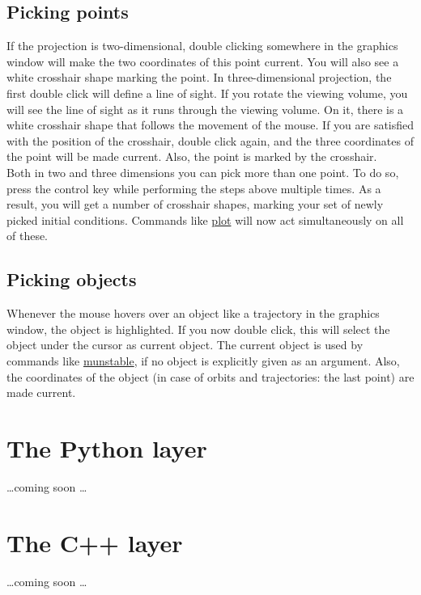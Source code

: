\documentclass[10pt,a4paper,titlepage]{article}
\newcommand{\HL}[1]{\hyperlink{#1}{#1}}
\begin{document}
\subsection{Picking points}
If the projection is two-dimensional, double clicking somewhere in the graphics window will make the two coordinates of this point current. You will also see a white crosshair shape marking the point. In three-dimensional projection, the first double click will define a line of sight. If you rotate the viewing volume, you will see the line of sight as it runs through the viewing volume. On it, there is a white crosshair shape that follows the movement of the mouse. If you are satisfied with the position of the crosshair, double click again, and the three coordinates of the point will be made current. Also, the point is marked by the crosshair.\\
Both in two and three dimensions you can pick more than one point. To do so, press the control key while performing the steps above multiple times. As a result, you will get a number of crosshair shapes, marking your set of newly picked initial conditions. Commands like \HL{plot} will now act simultaneously on all of these.
\subsection{Picking objects}
Whenever the mouse hovers over an object like a trajectory in the graphics window, the object is highlighted. If you now double click, this will select the object under the cursor as current object. The current object is used by commands like \HL{munstable}, if no object is explicitly given as an argument. Also, the coordinates of the object (in case of orbits and trajectories: the last point) are made current.
\newpage\section{The Python layer}
\ldots coming soon \ldots
\section{The C++ layer}
\ldots coming soon \ldots

\printindex*
\end{document}
